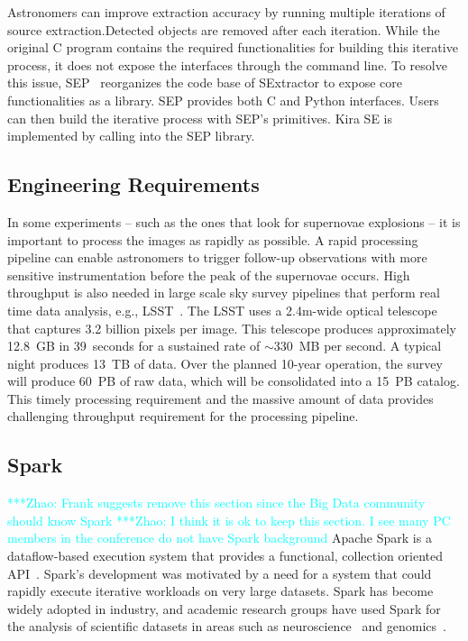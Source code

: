 \documentclass[conference]{IEEEtran}
\newcommand{\zhaonote}[1]{{\textcolor{cyan}    { ***Zhao:      #1 }}}
\newcommand{\zhaonote}[1]{}
\begin{document}
Astronomers can improve extraction accuracy by running multiple iterations of source
extraction.Detected objects are removed after each iteration. While
the original C program contains the required functionalities for building this iterative process,
it does not expose the interfaces through the command line. To resolve this issue,
SEP~\cite{barbary2015} reorganizes the code base of SExtractor to expose core
functionalities as a library. SEP provides both C and Python interfaces. Users can then
build the iterative process with SEP's primitives. Kira SE is implemented by calling into
the SEP library.

\subsection{Engineering Requirements}
\label{sec:Background-EngReq}

In some experiments -- such as the ones that look for supernovae explosions -- it is important to process
the images as rapidly as possible. A rapid processing pipeline can enable astronomers to trigger follow-up
observations with more sensitive instrumentation before the peak of the supernovae occurs.
High throughput is also needed in large scale
sky survey pipelines that perform real time data analysis, e.g., LSST~\cite{ivezic08}.
The LSST uses a 2.4m-wide optical telescope that captures 3.2 billion pixels per
image. This telescope produces approximately 12.8~GB in 39~seconds
for a sustained rate of $\sim$330~MB per second. A typical night produces 13~TB of data. 
Over the planned 10-year operation, the survey will produce 60~PB of raw data, which will be consolidated into a 15~PB catalog.
This timely processing requirement and the massive amount of data provides challenging throughput requirement for the 
processing pipeline. 

\subsection{Spark}
\zhaonote{Frank suggests remove this section since the Big Data community should know Spark}
\zhaonote{I think it is ok to keep this section. I see many PC members in the conference do not have Spark background}
Apache Spark is a dataflow-based execution system that provides a functional, collection
oriented API~\cite{zaharia12}. Spark's development was motivated by a need for a
system that could rapidly execute iterative workloads on very large datasets. Spark has
become widely adopted in industry, and academic research groups have used Spark
for the analysis of scientific datasets in areas such as neuroscience~\cite{freeman14} and genomics~\cite{nothaft15}.
\end{document}
